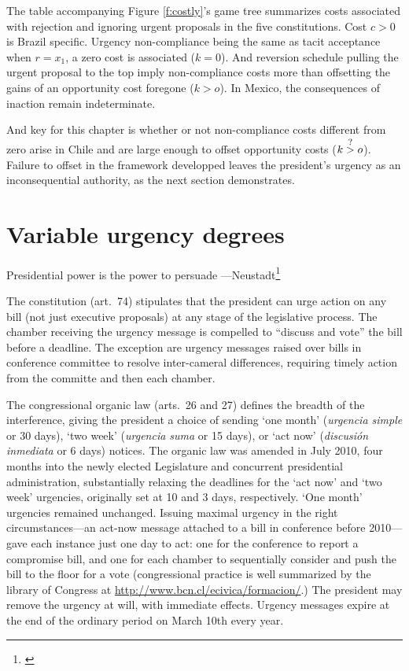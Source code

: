 \documentclass[letter,12pt]{article}
\begin{document}
The table accompanying Figure \ref{f:costly}'s game tree summarizes costs associated with rejection and ignoring urgent proposals in the five constitutions. Cost $c>0$ is Brazil specific. Urgency non-compliance being the same as tacit acceptance when $r=x_1$, a zero cost is associated ($k=0$). And reversion schedule pulling the urgent proposal to the top imply non-compliance costs more than offsetting the gains of an opportunity cost foregone ($k>o$). In Mexico, the consequences of inaction remain indeterminate. 

\newcommand\mygt{\mathrel{\stackrel{\makebox[0pt]{\mbox{\normalfont\footnotesize ?}}}{>}}} %

And key for this chapter is whether or not non-compliance costs different from zero arise in Chile and are large enough to offset opportunity costs ($k \mygt o$). Failure to offset in the framework developped leaves the president's urgency as an inconsequential authority, as the next section demonstrates. %

\section{Variable urgency degrees}
\begin{center}
Presidential power is the power to persuade ---Neustadt\footnote{\citet[][11]{neustadt.1990}}
\end{center}

The constitution (art.\ 74) stipulates that the president can urge action on any bill (not just executive proposals) at any stage of the legislative process. The chamber receiving the urgency message is compelled to ``discuss and vote'' the bill before a deadline. The exception are urgency messages raised over bills in conference committee to resolve inter-cameral differences, requiring timely action from the committe and then each chamber.

The congressional organic law (arts.\ 26 and 27) defines the breadth of the interference, giving the president a choice of sending `one month' (\emph{urgencia simple} or 30 days), `two week' (\emph{urgencia suma} or 15 days), or `act now' (\emph{discusión inmediata} or 6 days) notices. The organic law was amended in July 2010, four months into the newly elected Legislature and concurrent presidential administration, substantially relaxing the deadlines for the `act now' and `two week' urgencies, originally set at 10 and 3 days, respectively. `One month' urgencies remained unchanged. Issuing maximal urgency in the right circumstances---an act-now message attached to a bill in conference before 2010---gave each instance just one day to act: one for the conference to report a compromise bill, and one for each chamber to sequentially consider and push the bill to the floor for a vote (congressional practice is well summarized by the library of Congress at \url{http://www.bcn.cl/ecivica/formacion/}.) The president may remove the urgency at will, with immediate effects. Urgency messages expire at the end of the ordinary period on March 10th every year. 
\end{document}
